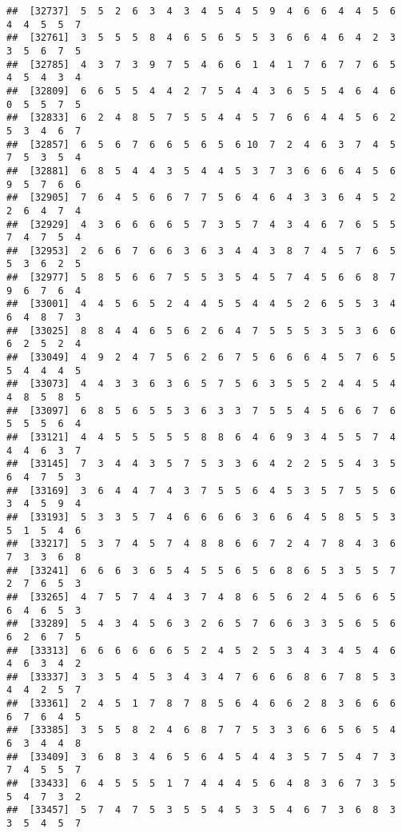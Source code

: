 \documentclass[
]{book}
\begin{document}
\begin{verbatim}
##  [32737]  5  5  2  6  3  4  3  4  5  4  5  9  4  6  6  4  4  5  6  4  4  5  5  7
##  [32761]  3  5  5  5  8  4  6  5  6  5  5  3  6  6  4  6  4  2  3  3  5  6  7  5
##  [32785]  4  3  7  3  9  7  5  4  6  6  1  4  1  7  6  7  7  6  5  4  5  4  3  4
##  [32809]  6  6  5  5  4  4  2  7  5  4  4  3  6  5  5  4  6  4  6  0  5  5  7  5
##  [32833]  6  2  4  8  5  7  5  5  4  4  5  7  6  6  4  4  5  6  2  5  3  4  6  7
##  [32857]  6  5  6  7  6  6  5  6  5  6 10  7  2  4  6  3  7  4  5  7  5  3  5  4
##  [32881]  6  8  5  4  4  3  5  4  4  5  3  7  3  6  6  6  4  5  6  9  5  7  6  6
##  [32905]  7  6  4  5  6  6  7  7  5  6  4  6  4  3  3  6  4  5  2  2  6  4  7  4
##  [32929]  4  3  6  6  6  6  5  7  3  5  7  4  3  4  6  7  6  5  5  7  4  7  5  4
##  [32953]  2  6  6  7  6  6  3  6  3  4  4  3  8  7  4  5  7  6  5  5  3  6  2  5
##  [32977]  5  8  5  6  6  7  5  5  3  5  4  5  7  4  5  6  6  8  7  9  6  7  6  4
##  [33001]  4  4  5  6  5  2  4  4  5  5  4  4  5  2  6  5  5  3  4  6  4  8  7  3
##  [33025]  8  8  4  4  6  5  6  2  6  4  7  5  5  5  3  5  3  6  6  6  2  5  2  4
##  [33049]  4  9  2  4  7  5  6  2  6  7  5  6  6  6  4  5  7  6  5  5  4  4  4  5
##  [33073]  4  4  3  3  6  3  6  5  7  5  6  3  5  5  2  4  4  5  4  4  8  5  8  5
##  [33097]  6  8  5  6  5  5  3  6  3  3  7  5  5  4  5  6  6  7  6  5  5  5  6  4
##  [33121]  4  4  5  5  5  5  5  8  8  6  4  6  9  3  4  5  5  7  4  4  4  6  3  7
##  [33145]  7  3  4  4  3  5  7  5  3  3  6  4  2  2  5  5  4  3  5  6  4  7  5  3
##  [33169]  3  6  4  4  7  4  3  7  5  5  6  4  5  3  5  7  5  5  6  3  4  5  9  4
##  [33193]  5  3  3  5  7  4  6  6  6  6  3  6  6  4  5  8  5  5  3  5  1  5  4  6
##  [33217]  5  3  7  4  5  7  4  8  8  6  6  7  2  4  7  8  4  3  6  7  3  3  6  8
##  [33241]  6  6  6  3  6  5  4  5  5  6  5  6  8  6  5  3  5  5  7  2  7  6  5  3
##  [33265]  4  7  5  7  4  4  3  7  4  8  6  5  6  2  4  5  6  6  5  6  4  6  5  3
##  [33289]  5  4  3  4  5  6  3  2  6  5  7  6  6  3  3  5  6  5  6  6  2  6  7  5
##  [33313]  6  6  6  6  6  6  5  2  4  5  2  5  3  4  3  4  5  4  6  4  6  3  4  2
##  [33337]  3  3  5  4  5  3  4  3  4  7  6  6  6  8  6  7  8  5  3  4  4  2  5  7
##  [33361]  2  4  5  1  7  8  7  8  5  6  4  6  6  2  8  3  6  6  6  6  7  6  4  5
##  [33385]  3  5  5  8  2  4  6  8  7  7  5  3  3  6  6  5  6  5  4  6  3  4  4  8
##  [33409]  3  6  8  3  4  6  5  6  4  5  4  4  3  5  7  5  4  7  3  7  4  5  5  7
##  [33433]  6  4  5  5  5  1  7  4  4  4  5  6  4  8  3  6  7  3  5  5  4  7  3  2
##  [33457]  5  7  4  7  5  3  5  5  4  5  3  5  4  6  7  3  6  8  3  3  5  4  5  7

\end{verbatim}
\end{document}
